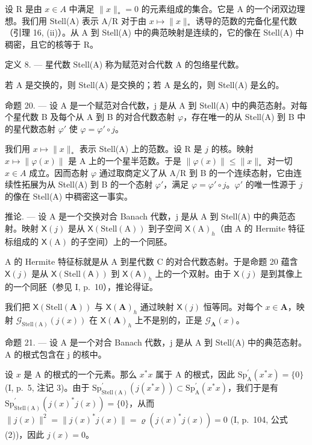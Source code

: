 设 R 是由 \(x \in A\) 中满足 \(\|x\|_{*} = 0\) 的元素组成的集合。它是 A 的一个闭双边理想。我们用 Stell(A) 表示 A/R 对于由 \(x \mapsto \|x\|_{*}\) 诱导的范数的完备化星代数（引理 16, (ii)）。从 A 到 Stell(A) 中的典范映射是连续的，它的像在 Stell(A) 中稠密，且它的核等于 R。

定义 8. --- 星代数 Stell(A) 称为赋范对合代数 A 的包络星代数。

若 A 是交换的，则 Stell(A) 是交换的；若 A 是幺的，则 Stell(A) 是幺的。

命题 20. --- 设 A 是一个赋范对合代数，j 是从 A 到 Stell(A) 中的典范态射。对每个星代数 B 及每个从 A 到 B 的对合代数态射 \(\varphi\)，存在唯一的从 Stell(A) 到 B 中的星代数态射 \(\varphi'\) 使 \(\varphi = \varphi' \circ j\)。

我们用 \(x \mapsto \|x\|_*\) 表示 Stell(A) 上的范数。设 R 是 \(j\) 的核。映射 \(x \mapsto \| \varphi(x) \|\) 是 A 上的一个星半范数。于是 \(\| \varphi(x) \| \leqslant \| x \|_*\) 对一切 \(x \in A\) 成立。因而态射 \(\varphi\) 通过取商定义了从 A/R 到 B 的一个连续态射，它由连续性拓展为从 Stell(A) 到 B 的一个态射 \(\varphi'\)，满足 \(\varphi = \varphi' \circ j\)。\(\varphi'\) 的唯一性源于 \(j\) 的像在 Stell(A) 中稠密这一事实。

推论. --- 设 A 是一个交换对合 Banach 代数，j 是从 A 到 Stell(A) 中的典范态射。映射 \(\mathsf{X}(j)\) 是从 \(\mathsf{X}(\mathrm{Stell}(\mathrm{A}))\) 到子空间 \(\mathsf{X}(\mathrm{A})_{h}\)（由 A 的 Hermite 特征标组成的 \(\mathsf{X}(\mathrm{A})\) 的子空间）上的一个同胚。

A 的 Hermite 特征标就是从 A 到星代数 C 的对合代数态射。于是命题 20 蕴含 \(\mathsf{X}(j)\) 是从 \(\mathsf{X}(\mathrm{Stell}(\mathsf{A}))\) 到 \(\mathsf{X}(\mathsf{A})_h\) 上的一个双射。由于 \(\mathsf{X}(j)\) 是到其像上的一个同胚（参见 I, p.~10），推论得证。

我们把 \(\mathsf{X}(\mathrm{Stell}(\mathbf{A}))\) 与 \(\mathsf{X}(\mathbf{A})_h\) 通过映射 \(\mathsf{X}(j)\) 恒等同。对每个 \(x\in \mathbf{A}\)，映射 \(\mathcal{G}_{\mathrm{Stell(A)}}(j(x))\) 在 \(\mathsf{X}(\mathbf{A})_h\) 上不是别的，正是 \(\mathcal{G}_{\mathbf{A}}(x)\)。

命题 21. --- 设 A 是一个对合 Banach 代数，j 是从 A 到 Stell(A) 中的典范态射。A 的根式包含在 j 的核中。

设 \(x\) 是 A 的根式的一个元素。那么 \(x^{*}x\) 属于 A 的根式，因此 \(\mathrm{Sp}_{\mathrm{A}}^{\prime}(x^{*}x) = \{0\}\) (I, p.~5, 注记 3)。由于 \(\mathrm{Sp}_{\mathrm{Stell(A)}}^{\prime}(j(x^{*}x)) \subset \mathrm{Sp}_{\mathrm{A}}^{\prime}(x^{*}x)\)，我们于是有 \(\mathrm{Sp}_{\mathrm{Stell(A)}}^{\prime}(j(x)^{*}j(x)) = \{0\}\)，从而 \(\| j(x)\| ^2 = \| j(x)^{*}j(x)\| = \varrho (j(x)^{*}j(x)) = 0\) (I, p.~104, 公式 (2))，因此 \(j(x) = 0\)。
